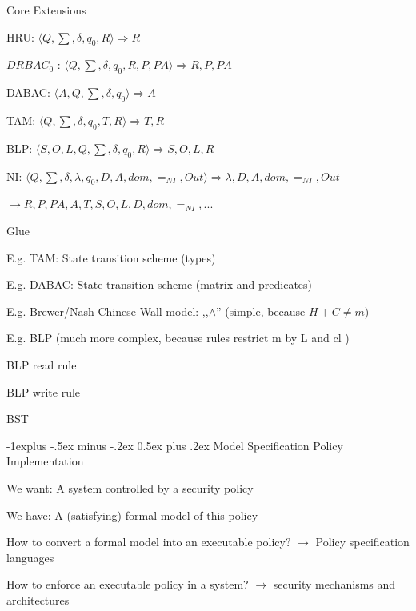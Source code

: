 \documentclass[a4paper]{article}
\makeatletter
\renewcommand{\subsection}{\@startsection{subsection}{2}{0mm}%
                                {-1explus -.5ex minus -.2ex}%
                                {0.5ex plus .2ex}%
                                {\normalfont\normalsize\bfseries}}
\makeatother
\begin{document}
\begin{multicols}{3}
    Core Extensions
    \begin{itemize*}
        \item HRU: $\langle  Q, \sum , \delta, q_0  , R \rangle  \Rightarrow R$
        \item $DRBAC_0$ : $\langle  Q, \sum , \delta, q_0  , R, P, PA \rangle  \Rightarrow R,P,PA$
        \item DABAC: $\langle  A , Q ,\sum , \delta, q_0  \rangle  \Rightarrow A$
        \item TAM: $\langle  Q , \sum , \delta, q_0  , T, R \rangle  \Rightarrow T,R$
        \item BLP: $\langle  S, O, L, Q , \sum , \delta, q_0  , R \rangle  \Rightarrow S,O,L,R$
        \item NI: $\langle  Q , \sum , \delta, \lambda ,q_0  , D, A, dom, =_{NI} , Out \rangle  \Rightarrow \lambda,D,A,dom,=_{NI},Out$
        \item $\rightarrow R, P, PA, A , T , S , O , L , D , dom , =_{NI} , ...$
    \end{itemize*}

    Glue
    \begin{itemize*}
        \item E.g. TAM: State transition scheme (types)
        \item E.g. DABAC: State transition scheme (matrix and predicates)
        \item E.g. Brewer/Nash Chinese Wall model: ,,$\wedge$'' (simple, because $H+C\not= m$)
        \item E.g. BLP (much more complex, because rules restrict m by L and cl )
        \begin{itemize*}
            \item BLP read rule
            \item BLP write rule
            \item BST
        \end{itemize*}
    \end{itemize*}

    \subsection{Model Specification}
    Policy Implementation
    \begin{itemize*}
        \item We want: A system controlled by a security policy
        \item We have: A (satisfying) formal model of this policy
        \item How to convert a formal model into an executable policy? $\rightarrow$ Policy specification languages
        \item How to enforce an executable policy in a system? $\rightarrow$ security mechanisms and architectures
    \end{itemize*}


\end{multicols}
\end{document}
